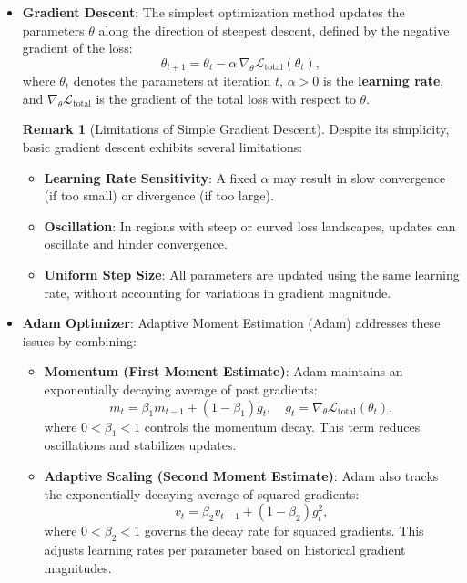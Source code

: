 \documentclass[12pt]{article}
\theoremstyle{definition}
\newtheorem{remark}{Remark}[subsection]
\begin{document}
\begin{itemize}

    \item \textbf{Gradient Descent}: The simplest optimization method updates the parameters $\theta$ along the direction of steepest descent, defined by the negative gradient of the loss:
    \[
    \theta_{t+1} = \theta_t - \alpha \, \nabla_\theta \mathcal{L}_{\text{total}}(\theta_t),
    \]
    where $\theta_t$ denotes the parameters at iteration $t$, $\alpha > 0$ is the \textbf{learning rate}, and $\nabla_\theta \mathcal{L}_{\text{total}}$ is the gradient of the total loss with respect to $\theta$.

    \begin{remark}[Limitations of Simple Gradient Descent]
    Despite its simplicity, basic gradient descent exhibits several limitations:
    \begin{itemize}
        \item \textbf{Learning Rate Sensitivity}: A fixed $\alpha$ may result in slow convergence (if too small) or divergence (if too large).
        \item \textbf{Oscillation}: In regions with steep or curved loss landscapes, updates can oscillate and hinder convergence.
        \item \textbf{Uniform Step Size}: All parameters are updated using the same learning rate, without accounting for variations in gradient magnitude.
    \end{itemize}
    \end{remark}

    \item \textbf{Adam Optimizer}: Adaptive Moment Estimation (Adam) addresses these issues by combining:
    \begin{itemize}
        \item \textbf{Momentum (First Moment Estimate)}: Adam maintains an exponentially decaying average of past gradients:
        \[
        m_t = \beta_1 m_{t-1} + (1 - \beta_1) g_t, \quad g_t = \nabla_\theta \mathcal{L}_{\text{total}}(\theta_t),
        \]
        where $0 < \beta_1 < 1$ controls the momentum decay. This term reduces oscillations and stabilizes updates.

        \item \textbf{Adaptive Scaling (Second Moment Estimate)}: Adam also tracks the exponentially decaying average of squared gradients:
        \[
        v_t = \beta_2 v_{t-1} + (1 - \beta_2) g_t^2,
        \]
        where $0 < \beta_2 < 1$ governs the decay rate for squared gradients. This adjusts learning rates per parameter based on historical gradient magnitudes.


\end{itemize}
\end{itemize}
\end{document}
